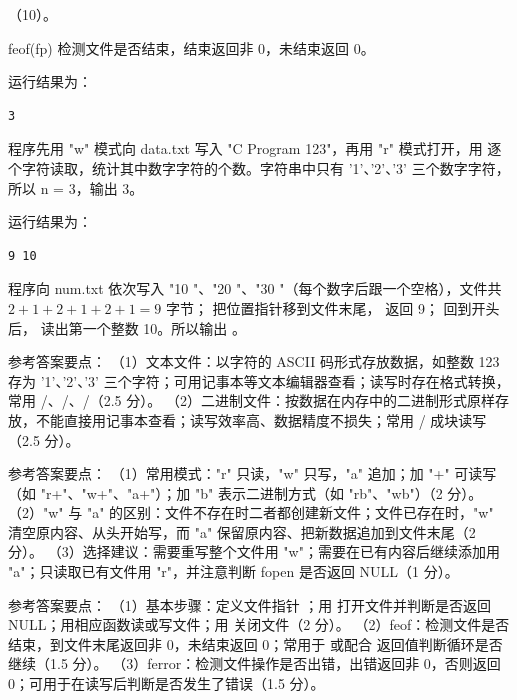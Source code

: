 \documentclass[a4paper,11pt]{article}
\begin{document}
\q （10）。\begin{analysis}feof(fp) 检测文件是否结束，结束返回非 0，未结束返回 0。\end{analysis}


\q 运行结果为：
\begin{lstlisting}
3
\end{lstlisting}
\begin{analysis}程序先用 "w" 模式向 data.txt 写入 "C Program 123"，再用 "r" 模式打开，用  逐个字符读取，统计其中数字字符的个数。字符串中只有 '1'、'2'、'3' 三个数字字符，所以 n = 3，输出 3。\end{analysis}

\q 运行结果为：
\begin{lstlisting}
9 10
\end{lstlisting}
\begin{analysis}程序向 num.txt 依次写入 "10 "、"20 "、"30 "（每个数字后跟一个空格），文件共 $2+1+2+1+2+1=9$ 字节； 把位置指针移到文件末尾， 返回 9； 回到开头后， 读出第一个整数 10。所以输出 。\end{analysis}


\q 参考答案要点：
（1）文本文件：以字符的 ASCII 码形式存放数据，如整数 123 存为 '1'、'2'、'3' 三个字符；可用记事本等文本编辑器查看；读写时存在格式转换，常用 /、/、/（2.5 分）。
（2）二进制文件：按数据在内存中的二进制形式原样存放，不能直接用记事本查看；读写效率高、数据精度不损失；常用 / 成块读写（2.5 分）。

\q 参考答案要点：
（1）常用模式："r" 只读，"w" 只写，"a" 追加；加 "+" 可读写（如 "r+"、"w+"、"a+"）；加 "b" 表示二进制方式（如 "rb"、"wb"）（2 分）。
（2）"w" 与 "a" 的区别：文件不存在时二者都创建新文件；文件已存在时，"w" 清空原内容、从头开始写，而 "a" 保留原内容、把新数据追加到文件末尾（2 分）。
（3）选择建议：需要重写整个文件用 "w"；需要在已有内容后继续添加用 "a"；只读取已有文件用 "r"，并注意判断 fopen 是否返回 NULL（1 分）。

\q 参考答案要点：
（1）基本步骤：定义文件指针 ；用  打开文件并判断是否返回 NULL；用相应函数读或写文件；用  关闭文件（2 分）。
（2）feof：检测文件是否结束，到文件末尾返回非 0，未结束返回 0；常用于  或配合  返回值判断循环是否继续（1.5 分）。
（3）ferror：检测文件操作是否出错，出错返回非 0，否则返回 0；可用于在读写后判断是否发生了错误（1.5 分）。
\end{document}
